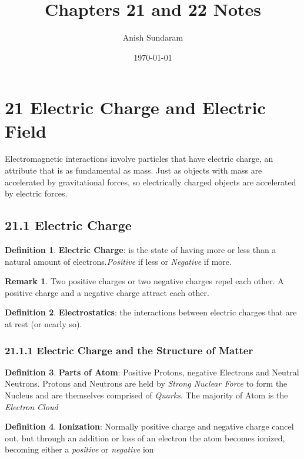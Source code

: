 \documentclass[12pt]{amsart}
\title{Chapters 21 and 22 Notes}
\author{Anish Sundaram}
\date{\today}
\theoremstyle{definition}
\newtheorem{definition}{Definition} %
\newtheorem*{remark}{Remark}        %
\numberwithin{equation}{theorem}    %
\begin{document}
\maketitle

\tableofcontents

\section*{21 Electric Charge and Electric Field}
Electromagnetic interactions involve particles that have electric charge, 
an attribute that is as fundamental as mass. Just as objects with mass are 
accelerated by gravitational forces, so electrically charged objects are 
accelerated by electric forces.


\subsection*{21.1 Electric Charge}
\begin{definition}
    \textbf{Electric Charge}: 
    is the state of having more or less than a natural
    amount of electrons.\textit{Positive} if less or \textit{Negative} if more. 
    \begin{remark}
        Two positive charges or two negative charges repel each other. A 
        positive charge and a negative charge attract each other.
    \end{remark}
\end{definition}

\begin{definition}
    \textbf{Electrostatics}: 
    the interactions between electric charges that are 
    at rest (or nearly so).
\end{definition}

\subsubsection*{21.1.1 Electric Charge and the Structure of Matter}

\begin{definition}
    \textbf{Parts of Atom}: 
    Positive Protons, negative Electrons and Neutral 
    Neutrons. Protons and Neutrons are held by \textit{Strong Nuclear Force} 
    to form the Nucleus and are themselves comprised of \textit{Quarks}. 
    The majority of Atom is the \textit{Electron Cloud}
\end{definition}

\begin{definition}
    \textbf{Ionization}: 
    Normally positive charge and negative charge cancel 
    out, but through an addition or loss of an electron the atom becomes 
    ionized, becoming either a \textit{positive} or \textit{negative} ion 
\end{definition}
\end{document}
